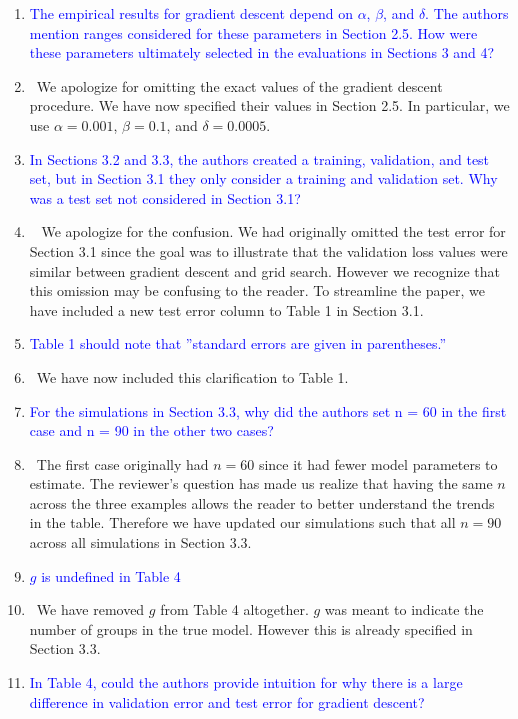 \documentclass[]{article}
\newcommand{\point}[1]{\item \textcolor{blue}{#1}}
\newcommand{\reply}{\item[]\ }
\begin{document}
\begin{enumerate}
		\point{The empirical results for gradient descent depend on $\alpha$, $\beta$, and $\delta$. The authors mention ranges considered for these parameters in Section 2.5. How were these parameters ultimately selected in the evaluations in Sections 3 and 4?}
		
		\reply We apologize for omitting the exact values of the gradient descent procedure. We have now specified their values in Section 2.5. In particular, we use $\alpha = 0.001$, $\beta = 0.1$, and $\delta = 0.0005$.
		
		\point{In Sections 3.2 and 3.3, the authors created a training, validation, and test set, but in Section 3.1 they only consider a training and validation set. Why was a test set not considered in Section 3.1?}
		
		\reply 
		We apologize for the confusion. We had originally omitted the test error for Section 3.1 since the goal was to illustrate that the validation loss values were similar between gradient descent and grid search. However we recognize that this omission may be confusing to the reader. To streamline the paper, we have included a new test error column to Table 1 in Section 3.1.
		
		\point{Table 1 should note that ”standard errors are given in parentheses.”}
		
		\reply We have now included this clarification to Table 1.
		
		\point{For the simulations in Section 3.3, why did the authors set n = 60 in the first case and
n = 90 in the other two cases?}
		
		\reply The first case originally had $n = 60$ since it had fewer model parameters to estimate. The reviewer's question has made us realize that having the same $n$ across the three examples allows the reader to better understand the trends in the table. Therefore we have updated our simulations such that all $n = 90$ across all simulations in Section 3.3.
		
		\point{$g$ is undefined in Table 4}
		
		\reply We have removed $g$ from Table 4 altogether. $g$ was meant to indicate the number of groups in the true model. However this is already specified in Section 3.3.
		
		\point{In Table 4, could the authors provide intuition for why there is a large difference in validation error and test error for gradient descent?}
		

\end{enumerate}
\end{document}
